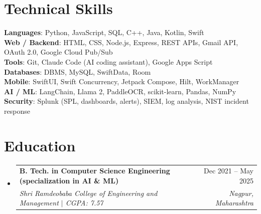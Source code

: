 \documentclass[a4paper,11pt]{article}
\makeatletter
\newcommand{\resumeSubheading}[4]{
  \vspace{-1pt}\item
    \begin{tabularx}{0.97\textwidth}[t]{@{}>{\raggedright\arraybackslash}X@{\hspace{0.75em}}r@{}}
      \textbf{#1} & #2 \\
      \textit{\small#3} & \textit{\small #4} \\
    \end{tabularx}\vspace{-3pt}
}
\newcommand{\resumeSubItemListStart}{\begin{itemize}[leftmargin=0.15in, label={}]}
\newcommand{\resumeSubItemListEnd}{\end{itemize}}
\makeatother
\begin{document}
\section{Technical Skills}
  \begin{itemize}[leftmargin=0.15in, label={}]
    \small{\item{
      \textbf{Languages}{: Python, JavaScript, SQL, C++, Java, Kotlin, Swift} \\
      \textbf{Web / Backend}{: HTML, CSS, Node.js, Express, REST APIs, Gmail API, OAuth 2.0, Google Cloud Pub/Sub} \\
      \textbf{Tools}{: Git, Claude Code (AI coding assistant), Google Apps Script} \\
      \textbf{Databases}{: DBMS, MySQL, SwiftData, Room} \\
      \textbf{Mobile}{: SwiftUI, Swift Concurrency, Jetpack Compose, Hilt, WorkManager} \\
      \textbf{AI / ML}{: LangChain, Llama 2, PaddleOCR, scikit-learn, Pandas, NumPy} \\
      \textbf{Security}{: Splunk (SPL, dashboards, alerts), SIEM, log analysis, NIST incident response}
    }}
  \end{itemize}

\section{Education}
  \resumeSubItemListStart
    \resumeSubheading
      {B. Tech. in Computer Science Engineering (specialization in AI \& ML)}{Dec 2021 -- May 2025}
      {Shri Ramdeobaba College of Engineering and Management $|$ CGPA: 7.57}{Nagpur, Maharashtra}
  \resumeSubItemListEnd
\end{document}
